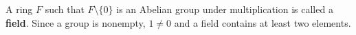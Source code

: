 A ring \(F\) such that \(F \setminus \{0\}\) is an Abelian group under multiplication is called a \textbf{field}. Since a group is nonempty, \(1 \neq 0\) and a field contains at least two elements.